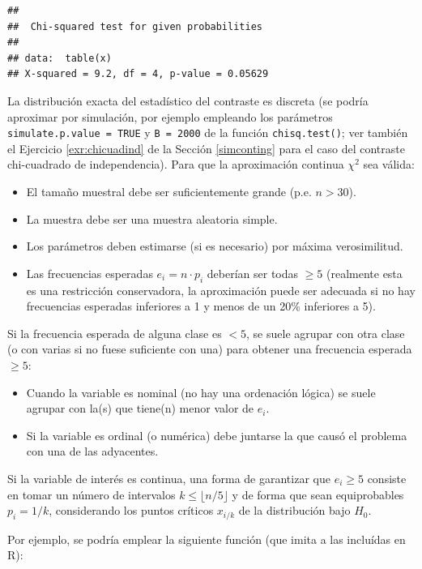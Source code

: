 \documentclass[
]{book}
\theoremstyle{break}
\theoremstyle{definition}
\theoremstyle{definition}
\theoremstyle{definition}
\theoremstyle{definition}
\theoremstyle{remark}
\begin{document}
\begin{verbatim}
## 
##  Chi-squared test for given probabilities
## 
## data:  table(x)
## X-squared = 9.2, df = 4, p-value = 0.05629
\end{verbatim}

La distribución exacta del estadístico del contraste es discreta (se podría aproximar por simulación, por ejemplo empleando los parámetros \texttt{simulate.p.value\ =\ TRUE} y \texttt{B\ =\ 2000} de la función \texttt{chisq.test()}; ver también el Ejercicio \ref{exr:chicuadind} de la Sección \ref{simconting} para el caso del contraste chi-cuadrado de independencia).
Para que la aproximación continua \(\chi^2\) sea válida:

\begin{itemize}
\item
  El tamaño muestral debe ser suficientemente grande (p.e. \(n>30\)).
\item
  La muestra debe ser una muestra aleatoria simple.
\item
  Los parámetros deben estimarse (si es necesario) por máxima
  verosimilitud.
\item
  Las frecuencias esperadas \(e_{i}=n\cdot p_{i}\) deberían ser todas
  \(\geq5\) (realmente esta es una restricción conservadora, la aproximación
  puede ser adecuada si no hay frecuencias esperadas inferiores a 1 y
  menos de un 20\% inferiores a 5).
\end{itemize}

Si la frecuencia esperada de alguna clase es \(<5\), se suele agrupar con otra
clase (o con varias si no fuese suficiente con una) para obtener una
frecuencia esperada \(\geq5\):

\begin{itemize}
\item
  Cuando la variable es nominal (no hay una ordenación lógica) se
  suele agrupar con la(s) que tiene(n) menor valor de \(e_{i}\).
\item
  Si la variable es ordinal (o numérica) debe juntarse la que causó el
  problema con una de las adyacentes.
\end{itemize}

Si la variable de interés es continua, una forma de garantizar que \(e_{i}\geq5\) consiste en tomar un número de intervalos \(k\leq \lfloor n/5 \rfloor\) y de forma que sean equiprobables \(p_{i}=1/k\),
considerando los puntos críticos \(x_{i/k}\) de la distribución bajo \(H_0\).

Por ejemplo, se podría emplear la siguiente función (que imita a las incluídas en R):
\end{document}
